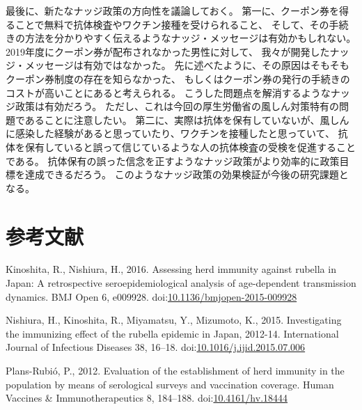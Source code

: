 \documentclass[
  11pt,
  a4paper,
]{article}
\newlength{\cslhangindent}
\newlength{\cslentryspacingunit} %
\newenvironment{CSLReferences}[2] %
 {%
  \setlength{\parindent}{0pt}
  \ifodd #1
  \let\oldpar\par
  \def\par{\hangindent=\cslhangindent\oldpar}
  \fi
  \setlength{\parskip}{#2\cslentryspacingunit}
 }%
 {}
\begin{document}
最後に、新たなナッジ政策の方向性を議論しておく。
第一に、クーポン券を得ることで無料で抗体検査やワクチン接種を受けられること、
そして、その手続きの方法を分かりやすく伝えるようなナッジ・メッセージは有効かもしれない。
2019年度にクーポン券が配布されなかった男性に対して、
我々が開発したナッジ・メッセージは有効ではなかった。
先に述べたように、その原因はそもそもクーポン券制度の存在を知らなかった、
もしくはクーポン券の発行の手続きのコストが高いことにあると考えられる。
こうした問題点を解消するようなナッジ政策は有効だろう。
ただし、これは今回の厚生労働省の風しん対策特有の問題であることに注意したい。
第二に、実際は抗体を保有していないが、風しんに感染した経験があると思っていたり、ワクチンを接種したと思っていて、
抗体を保有していると誤って信じているような人の抗体検査の受検を促進することである。
抗体保有の誤った信念を正すようなナッジ政策がより効率的に政策目標を達成できるだろう。
このようなナッジ政策の効果検証が今後の研究課題となる。

\newpage

\hypertarget{ux53c2ux8003ux6587ux732e}{%
\section*{参考文献}\label{ux53c2ux8003ux6587ux732e}}

\hypertarget{refs}{}
\begin{CSLReferences}{1}{0}
\leavevmode{}%
Kinoshita, R., Nishiura, H., 2016. Assessing herd immunity against rubella in {Japan}: A retrospective seroepidemiological analysis of age-dependent transmission dynamics. BMJ Open 6, e009928. doi:\href{https://doi.org/10.1136/bmjopen-2015-009928}{10.1136/bmjopen-2015-009928}

\leavevmode{}%
Nishiura, H., Kinoshita, R., Miyamatsu, Y., Mizumoto, K., 2015. Investigating the immunizing effect of the rubella epidemic in {Japan}, 2012-14. International Journal of Infectious Diseases 38, 16--18. doi:\href{https://doi.org/10.1016/j.ijid.2015.07.006}{10.1016/j.ijid.2015.07.006}

\leavevmode{}%
Plans-Rubió, P., 2012. Evaluation of the establishment of herd immunity in the population by means of serological surveys and vaccination coverage. Human Vaccines \& Immunotherapeutics 8, 184--188. doi:\href{https://doi.org/10.4161/hv.18444}{10.4161/hv.18444}

\end{CSLReferences}
\end{document}
